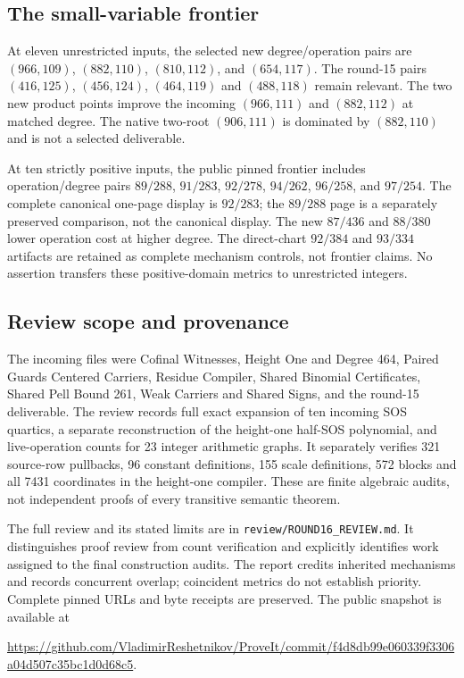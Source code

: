 \subsection{The small-variable frontier}
At eleven unrestricted inputs, the selected new degree/operation pairs are $(966,109)$, $(882,110)$, $(810,112)$, and $(654,117)$. The round-15 pairs $(416,125)$, $(456,124)$, $(464,119)$ and $(488,118)$ remain relevant. The two new product points improve the incoming $(966,111)$ and $(882,112)$ at matched degree. The native two-root $(906,111)$ is dominated by $(882,110)$ and is not a selected deliverable.

At ten strictly positive inputs, the public pinned frontier includes operation/degree pairs $89/288$, $91/283$, $92/278$, $94/262$, $96/258$, and $97/254$. The complete canonical one-page display is $92/283$; the $89/288$ page is a separately preserved comparison, not the canonical display. The new $87/436$ and $88/380$ lower operation cost at higher degree. The direct-chart $92/384$ and $93/334$ artifacts are retained as complete mechanism controls, not frontier claims. No assertion transfers these positive-domain metrics to unrestricted integers.

\subsection{Review scope and provenance}
The incoming files were Cofinal Witnesses, Height One and Degree 464, Paired Guards Centered Carriers, Residue Compiler, Shared Binomial Certificates, Shared Pell Bound 261, Weak Carriers and Shared Signs, and the round-15 deliverable. The review records full exact expansion of ten incoming SOS quartics, a separate reconstruction of the height-one half-SOS polynomial, and live-operation counts for 23 integer arithmetic graphs. It separately verifies 321 source-row pullbacks, 96 constant definitions, 155 scale definitions, 572 blocks and all 7431 coordinates in the height-one compiler. These are finite algebraic audits, not independent proofs of every transitive semantic theorem.

The full review and its stated limits are in \nolinkurl{review/ROUND16_REVIEW.md}. It distinguishes proof review from count verification and explicitly identifies work assigned to the final construction audits. The report credits inherited mechanisms and records concurrent overlap; coincident metrics do not establish priority. Complete pinned URLs and byte receipts are preserved. The public snapshot is available at
\begin{center}\small
\url{https://github.com/VladimirReshetnikov/ProveIt/commit/f4d8db99e060339f3306a04d507c35bc1d0d68c5}.
\end{center}
